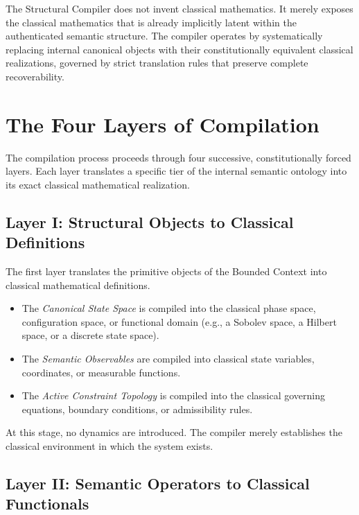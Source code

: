 \documentclass[12pt,openany]{extbook}
\theoremstyle{plain}
\theoremstyle{definition}
\begin{document}
The Structural Compiler does not invent classical mathematics. It merely exposes the classical mathematics that is already implicitly latent within the authenticated semantic structure. The compiler operates by systematically replacing internal canonical objects with their constitutionally equivalent classical realizations, governed by strict translation rules that preserve complete recoverability.

\section{The Four Layers of Compilation}

The compilation process proceeds through four successive, constitutionally forced layers. Each layer translates a specific tier of the internal semantic ontology into its exact classical mathematical realization.

\subsection{Layer I: Structural Objects to Classical Definitions}

The first layer translates the primitive objects of the Bounded Context into classical mathematical definitions. 
\begin{itemize}
    \item The \emph{Canonical State Space} is compiled into the classical phase space, configuration space, or functional domain (e.g., a Sobolev space, a Hilbert space, or a discrete state space).
    \item The \emph{Semantic Observables} are compiled into classical state variables, coordinates, or measurable functions.
    \item The \emph{Active Constraint Topology} is compiled into the classical governing equations, boundary conditions, or admissibility rules.
\end{itemize}
At this stage, no dynamics are introduced. The compiler merely establishes the classical environment in which the system exists.

\subsection{Layer II: Semantic Operators to Classical Functionals}
\end{document}

